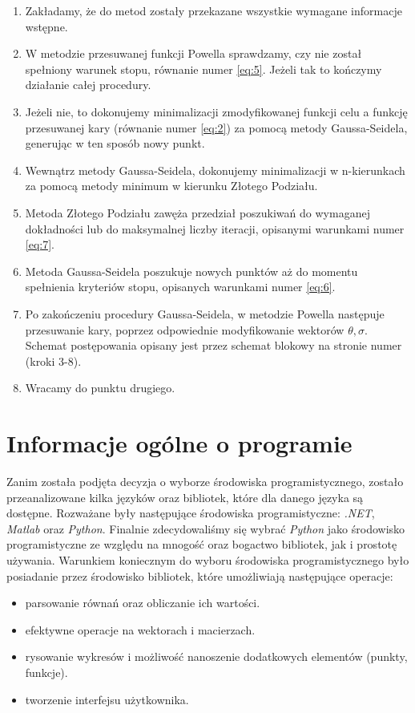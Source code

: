 \documentclass[a4paper,12pt]{article}
\begin{document}
\begin{enumerate}
    \item Zakładamy, że do metod zostały przekazane wszystkie wymagane informacje wstępne.
    \item W metodzie przesuwanej funkcji Powella sprawdzamy, czy nie został spełniony warunek stopu, równanie numer \ref{eq:5}. Jeżeli tak to kończymy działanie całej procedury.
    \item Jeżeli nie, to dokonujemy minimalizacji zmodyfikowanej funkcji celu a funkcję przesuwanej kary (równanie numer \ref{eq:2}) za pomocą metody Gaussa-Seidela, generując w ten sposób nowy punkt.
    \item Wewnątrz metody Gaussa-Seidela, dokonujemy minimalizacji w n-kierunkach za pomocą metody minimum w kierunku Złotego Podziału.
    \item Metoda Złotego Podziału zawęża przedział poszukiwań do wymaganej dokładności lub do maksymalnej liczby iteracji, opisanymi warunkami numer \ref{eq:7}.
    \item Metoda Gaussa-Seidela poszukuje nowych punktów aż do momentu spełnienia kryteriów stopu, opisanych warunkami numer \ref{eq:6}.
    \item Po zakończeniu procedury Gaussa-Seidela, w metodzie Powella następuje przesuwanie kary, poprzez odpowiednie modyfikowanie wektorów $\theta, \sigma$. Schemat postępowania opisany jest przez schemat blokowy na stronie numer \pageref{uml_powell} (kroki 3-8).
    \item Wracamy do punktu drugiego.
\end{enumerate}


\section{Informacje ogólne o programie}
Zanim została podjęta decyzja o wyborze środowiska programistycznego, zostało przeanalizowane kilka języków oraz bibliotek, które dla danego języka są dostępne. Rozważane były następujące środowiska programistyczne: \textit{.NET}, \textit{Matlab} oraz \textit{Python}. Finalnie zdecydowaliśmy się wybrać \textit{Python} jako środowisko programistyczne ze względu na mnogość oraz bogactwo bibliotek, jak i prostotę używania. Warunkiem koniecznym do wyboru środowiska programistycznego było posiadanie przez środowisko bibliotek, które umożliwiają następujące operacje: 
\begin{itemize}
    \item parsowanie równań oraz obliczanie ich wartości.
    \item efektywne operacje na wektorach i macierzach.
    \item rysowanie wykresów i możliwość nanoszenie dodatkowych elementów (punkty, funkcje).
    \item tworzenie interfejsu użytkownika.
\end{itemize} 
\end{document}
